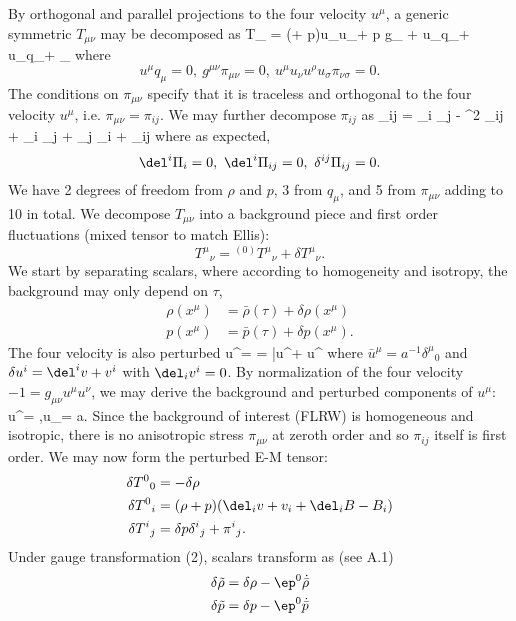 \documentclass[10pt,letterpaper]{article}
\begin{document}
By orthogonal and parallel projections to the four velocity $u^\mu$, a generic symmetric $T_{\mu\nu}$ may be decomposed as
\be
	T_{\mu\nu} = (\rho + p)u_\mu u_\nu + p g_{\mu\nu} + u_\nu q_\mu + u_\mu q_\nu + \pi_{\mu\nu}
\ee
where
\[
	u^\mu q_\mu = 0,\ g^{\mu\nu} \pi_{\mu\nu} = 0, \ u^\mu u_\nu u^\rho u_\sigma \pi_{\nu\sigma} = 0.
\]
The conditions on $\pi_{\mu\nu}$ specify that it is traceless and orthogonal to the four velocity $u^\mu$, i.e. $\pi_{\mu\nu} = \pi_{ij}$. We may further decompose $\pi_{ij}$ as
\be
	\pi_{ij} = \del_i \del_j \Pi -  \del^2 \Pi \delta_{ij} +  \del_i \Pi_j +  \del_j \Pi_i + \Pi_{ij}
\ee
where as expected,
\[
	\del^i \Pi_i = 0,\  \del^i\Pi_{ij} = 0,\ \delta^{ij}\Pi_{ij} = 0.
\]
We have 2 degrees of freedom from $\rho$ and $p$, 3 from $q_\mu$, and 5 from $\pi_{\mu\nu}$ adding to 10 in total. We decompose $T_{\mu\nu}$ into a background piece and first order fluctuations (mixed tensor to match Ellis):
\[
	T^\mu{}_\nu = {}^{(0)}T^{\mu}{}_\nu + \delta T^\mu{}_\nu.
\]
We start by separating scalars, where according to homogeneity and isotropy, the background may only depend on $\tau$, 
\begin{align}
	\rho(x^\mu) &= \bar \rho(\tau) + \delta \rho(x^\mu)\\
	p(x^\mu) &= \bar p(\tau) + \delta p(x^\mu).
\end{align}
The four velocity is also perturbed
\be
	u^\mu = = \bar u^\mu + \delta u^\mu
\ee
where $\bar u^\mu = a^{-1} \delta^\mu{}_0$ and $\delta u^i = \del^i v + v^i$ with $\del_i v^i = 0$. By normalization of the four velocity $-1 = g_{\mu\nu}u^\mu u^\nu$, we may derive the background and perturbed components of $u^\mu$:
\be
	u^\mu = ,\qquad u_\mu = a.
\ee
Since the background of interest (FLRW) is homogeneous and isotropic, there is no anisotropic stress $\pi_{\mu\nu}$ at zeroth order and so $\pi_{ij}$ itself is first order. We may now form the perturbed E-M tensor:
\begin{align}
	\delta T^0{}_0 &= - \delta \rho \\
	\delta T^0{}_i &= (\rho+p)(\del_i v + v_i + \del_i B - B_i)\\
	\delta T^i{}_j &= \delta p\delta^i{}_j + \pi^i{}_j.
\end{align}
Under gauge transformation (2), scalars transform as (see A.1)
\begin{align}
	\delta \tilde \rho &= \delta \rho - \ep^0 \dot{\bar\rho}\\
\delta \tilde p &= \delta p - \ep^0 \dot{\bar p}
\end{align}
\end{document}
